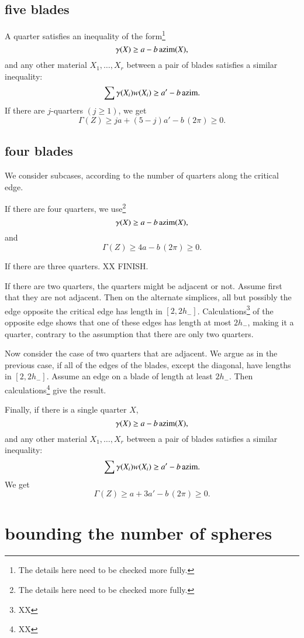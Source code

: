 \subsection{five blades}


A quarter satisfies an inequality of the form\footnote{The details here need to be checked more fully.}
$$
\gamma(X) \ge a - b\, {\operatorname{azim}}(X),
$$
and any other material $X_1,\ldots,X_r$
between a pair of blades
satisfies a similar inequality:
$$
\sum \gamma(X_i)w(X_i) \ge a' - b\,{\operatorname{azim}}.
$$
If there are $j$-quarters $(j\ge1)$, we get
$$
\Gamma(Z) \ge j a + (5-j) a' - b\, (2\pi) \ge 0.
$$

\subsection{four blades}

We consider subcases, according to the number of quarters along the critical edge.

If there are four quarters, we use\footnote{The details here need to be checked more fully.}
$$
\gamma(X) \ge a - b\, {\operatorname{azim}}(X),
$$
and
$$
\Gamma(Z) \ge 4 a  - b\, (2\pi) \ge 0.
$$

If there are three quarters. XX FINISH.

If there are two quarters, the quarters might be adjacent or not.  Assume first that they are not adjacent.  Then
on the alternate simplices, all but possibly the edge
opposite the critical edge has length in $[2,2h_-]$.
Calculations\footnote{XX} of the opposite edge shows that
one of these edges has length at most $2h_-$, making it a quarter, contrary to the assumption that there are only two quarters.

Now consider the case of two quarters that are adjacent.  We argue as in the previous case, if all of the edges of the blades, except the diagonal, have lengths in $[2,2h_-]$.  Assume an edge on a blade of length at least $2h_-$.  Then calculations\footnote{XX} give the result.

Finally, if there is a single quarter $X$, 
$$
\gamma(X) \ge a - b\, {\operatorname{azim}}(X),
$$
and any other material $X_1,\ldots,X_r$
between a pair of blades
satisfies a similar inequality:
$$
\sum \gamma(X_i)w(X_i) \ge a' - b\,{\operatorname{azim}}.
$$
We get
$$
\Gamma(Z) \ge  a + 3 a' - b\, (2\pi) \ge 0.
$$

\section{bounding the number of spheres}

